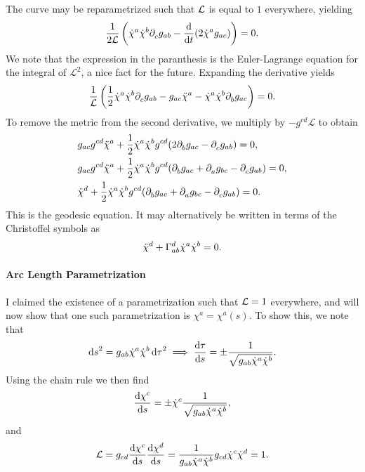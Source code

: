 The curve may be reparametrized such that $\mathcal{L}$ is equal to $1$ everywhere, yielding
\begin{align*}
	\frac{1}{2\mathcal{L}}\left(\dot{\chi}^{a}\dot{\chi}^{b}\partial^{}_{c}{g_{ab}} - \dv{t}(2\dot{\chi}^{a}g_{ac})\right) = 0.
\end{align*}
We note that the expression in the paranthesis is the Euler-Lagrange equation for the integral of $\mathcal{L}^{2}$, a nice fact for the future. Expanding the derivative yields
\begin{align*}
	\frac{1}{\mathcal{L}}\left(\frac{1}{2}\dot{\chi}^{a}\dot{\chi}^{b}\partial^{}_{c}{g_{ab}} - g_{ac}\ddot{\chi}^{a} - \dot{\chi}^{a}\dot{\chi}^{b}\partial^{}_{b}{g_{ac}}\right) = 0.
\end{align*}
To remove the metric from the second derivative, we multiply by $-g^{cd}\mathcal{L}$ to obtain
\begin{align*}
	&g_{ac}g^{cd}\ddot{\chi}^{a} + \frac{1}{2}\dot{\chi}^{a}\dot{\chi}^{b}g^{cd}(2\partial^{}_{b}{g_{ac}} - \partial^{}_{c}{g_{ab}}) = 0, \\
	&g_{ac}g^{cd}\ddot{\chi}^{a} + \frac{1}{2}\dot{\chi}^{a}\dot{\chi}^{b}g^{cd}(\partial^{}_{b}{g_{ac}} + \partial^{}_{a}{g_{bc}} - \partial^{}_{c}{g_{ab}}) = 0, \\
	&\ddot{\chi}^{d} + \frac{1}{2}\dot{\chi}^{a}\dot{\chi}^{b}g^{cd}(\partial^{}_{b}{g_{ac}} + \partial^{}_{a}{g_{bc}} - \partial^{}_{c}{g_{ab}}) = 0.
\end{align*}
This is the geodesic equation. It may alternatively be written in terms of the Christoffel symbols as
\begin{align*}
	\ddot{\chi}^{d} + \chris{d}{a}{b}\dot{\chi}^{a}\dot{\chi}^{b} = 0.
\end{align*}

\paragraph{Arc Length Parametrization}
I claimed the existence of a parametrization such that $\mathcal{L} = 1$ everywhere, and will now show that one such parametrization is $\chi^{a} = \chi^{a}(s)$. To show this, we note that
\begin{align*}
	\dd{s}^{2} = g_{ab}\dot{\chi}^{a}\dot{\chi}^{b}\dd{\tau}^{2} \implies \dv{\tau}{s} = \pm\frac{1}{\sqrt{g_{ab}\dot{\chi}^{a}\dot{\chi}^{b}}}.
\end{align*}
Using the chain rule we then find
\begin{align*}
	\dv{\chi^{c}}{s} = \pm\dot{\chi}^{c}\frac{1}{\sqrt{g_{ab}\dot{\chi}^{a}\dot{\chi}^{b}}},
\end{align*}
and
\begin{align*}
	\mathcal{L} = g_{cd}\dv{\chi^{c}}{s}\dv{\chi^{d}}{s} = \frac{1}{g_{ab}\dot{\chi}^{a}\dot{\chi}^{b}}g_{cd}\dot{\chi}^{c}\dot{\chi}^{d} = 1.
\end{align*}

